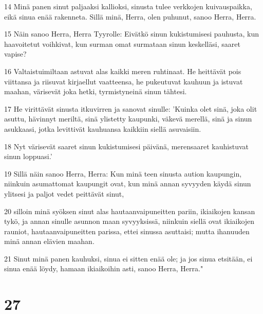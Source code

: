 \par 14 Minä panen sinut paljaaksi kallioksi, sinusta tulee verkkojen kuivauspaikka, eikä sinua enää rakenneta. Sillä minä, Herra, olen puhunut, sanoo Herra, Herra.
\par 15 Näin sanoo Herra, Herra Tyyrolle: Eivätkö sinun kukistumisesi pauhusta, kun haavoitetut voihkivat, kun surman omat surmataan sinun keskelläsi, saaret vapise?
\par 16 Valtaistuimiltaan astuvat alas kaikki meren ruhtinaat. He heittävät pois viittansa ja riisuvat kirjaellut vaatteensa, he pukeutuvat kauhuun ja istuvat maahan, värisevät joka hetki, tyrmistyneinä sinun tähtesi.
\par 17 He virittävät sinusta itkuvirren ja sanovat sinulle: 'Kuinka olet sinä, joka olit asuttu, hävinnyt meriltä, sinä ylistetty kaupunki, väkevä merellä, sinä ja sinun asukkaasi, jotka levittivät kauhuansa kaikkiin siellä asuvaisiin.
\par 18 Nyt värisevät saaret sinun kukistumisesi päivänä, merensaaret kauhistuvat sinun loppuasi.'
\par 19 Sillä näin sanoo Herra, Herra: Kun minä teen sinusta aution kaupungin, niinkuin asumattomat kaupungit ovat, kun minä annan syvyyden käydä sinun ylitsesi ja paljot vedet peittävät sinut,
\par 20 silloin minä syöksen sinut alas hautaanvaipuneitten pariin, ikiaikojen kansan tykö, ja annan sinulle asunnon maan syvyyksissä, niinkuin siellä ovat ikiaikojen rauniot, hautaanvaipuneitten parissa, ettei sinussa asuttaisi; mutta ihanuuden minä annan elävien maahan.
\par 21 Sinut minä panen kauhuksi, sinua ei sitten enää ole; ja jos sinua etsitään, ei sinua enää löydy, hamaan ikiaikoihin asti, sanoo Herra, Herra."

\chapter{27}

